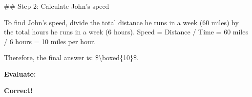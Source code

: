 \begin{tcolorbox}[
  colback=white, colframe=black, arc=3mm, width=2\columnwidth,
  title=\textbf{Example Input-Output for Zero-Shot Assist-CoT (GSM8K)},
  coltitle=white, colbacktitle=gray, fonttitle=\bfseries
]
\#\# Step 2: Calculate John's speed

To find John's speed, divide the total distance he runs in a week (60 miles) by the total hours he runs in a week (6 hours). Speed = Distance / Time = 60 miles / 6 hours = 10 miles per hour.

Therefore, the final answer is: \$\textbackslash boxed\{10\}\$.

\vspace{5pt}
\textbf{Evaluate:}

{\bf \color{darkgreen}Correct!}

\end{tcolorbox}



